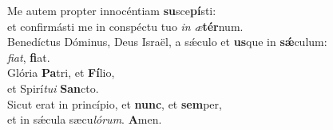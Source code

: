 \oddverse Me autem propter innocéntiam \textbf{su}sce\textbf{pí}sti:~\*\\
\oddverse et confirmásti me in conspéctu tuo \textit{in} \textit{æ}\textbf{tér}num.\\
\evenverse Benedíctus Dóminus, Deus Israël, a sǽculo et \textbf{us}que in \textbf{sǽ}culum:~\*\\
\evenverse \textit{fi}\textit{at}, \textbf{fi}at.\\
\oddverse Glória \textbf{Pa}tri, et \textbf{Fí}lio,~\*\\
\oddverse et Spirí\textit{tu}\textit{i} \textbf{San}cto.\\
\evenverse Sicut erat in princípio, et \textbf{nunc}, et \textbf{sem}per,~\*\\
\evenverse et in sǽcula sæcu\textit{ló}\textit{rum}. \textbf{A}men.\\
